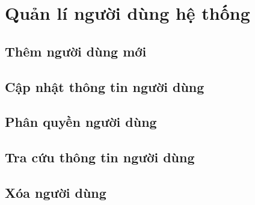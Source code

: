 \section{Quản lí người dùng hệ thống}


\subsection{Thêm người dùng mới} 

\subsection{Cập nhật thông tin người dùng}

\subsection{Phân quyền người dùng}

\subsection{Tra cứu thông tin người dùng}

\subsection{Xóa người dùng}

